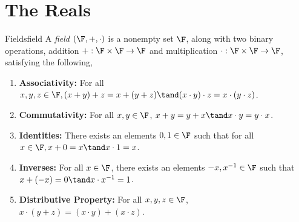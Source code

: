 \documentclass{report}
\begin{document}
\chapter{The Reals}

\begin{definition}{Fields}{field}
  A \emph{field} $\left(\F, +, \cdot\right)$ is a nonempty set $\F$, along with two binary operations,
  addition $+: \F \times \F \rightarrow \F$
  and multiplication $\cdot: \F \times \F \rightarrow \F$, satisfying the following,

  \begin{enumerate}
    \item \textbf{Associativity:} For all $x, y, z \in \F, (x + y) + z = x + (y + z) \tand (x \cdot y) \cdot z = x \cdot (y \cdot z)$.
    \item \textbf{Commutativity:} For all $x, y \in \F$, $x + y = y + x \tand x \cdot y = y \cdot x$.
    \item \textbf{Identities:} There exists an elements $0, 1 \in \F$ such that for all $x \in \F, x + 0 = x \tand x \cdot 1 = x$.
    \item \textbf{Inverses:} For all $x \in \F$, there exists an elements $-x, x^{-1} \in \F$ such that $x + (-x) = 0 \tand x \cdot x^{-1} = 1$.
    \item \textbf{Distributive Property:} For all $x, y, z \in \F$, $x \cdot (y + z) = (x \cdot y) + (x \cdot z)$.
  \end{enumerate}

\end{definition}
\end{document}
